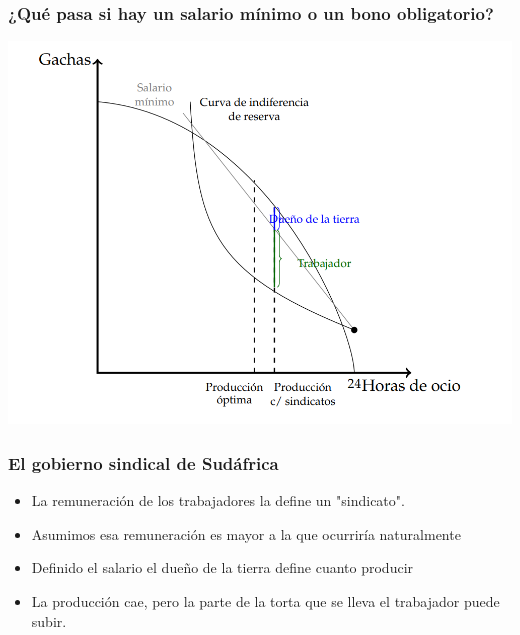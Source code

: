 \documentclass{beamer}
\begin{document}
\begin{frame}
\frametitle{¿Qué pasa si hay un salario mínimo o un bono obligatorio?}
\centering
\includegraphics[scale=0.8]{../Figures/Salariominimo.png}
\end{frame}

\begin{frame}
\frametitle{El gobierno sindical de Sudáfrica}
\begin{itemize}
    \item La remuneración de los trabajadores la define un "sindicato". 
    \item  Asumimos esa remuneración es mayor a la que ocurriría naturalmente
    \item Definido el salario el dueño de la tierra define cuanto producir
    \item  La producción cae, pero la parte de la torta que se lleva el trabajador puede subir. 
\end{itemize}
\end{frame}
\end{document}
